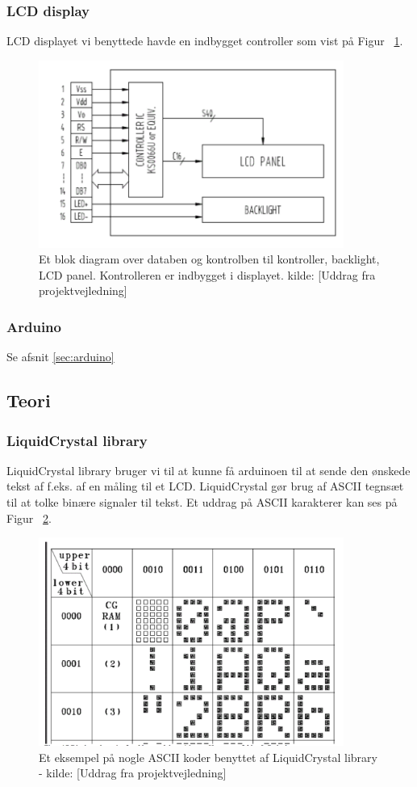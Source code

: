 \subsubsection{LCD display}
LCD displayet vi benyttede havde en indbygget controller som vist på Figur ~\ref{driver}.
\begin{figure}[H]
	\centering
    \includegraphics[width=10cm]{figures/LCDdesign/displayblokdiagram.png}
	\caption{Et blok diagram over databen og kontrolben til  kontroller, backlight, LCD panel. Kontrolleren er indbygget i displayet. kilde: [Uddrag fra projektvejledning]}
	\label{driver}
\end{figure}
\subsubsection{Arduino}
Se afsnit \ref{sec:arduino} 


\subsection{Teori}
\subsubsection{LiquidCrystal library}
LiquidCrystal library bruger vi til at kunne få arduinoen til at sende den ønskede tekst af f.eks. af en måling til et LCD. LiquidCrystal gør brug af ASCII tegnsæt til at tolke binære signaler til tekst. Et uddrag på ASCII karakterer kan ses på Figur ~\ref{ASCII}. 
\begin{figure}[H]
	\centering
    \includegraphics[width=10cm]{figures/LCDdesign/ASCII.png}
	\caption{Et eksempel på nogle ASCII koder benyttet af LiquidCrystal library - kilde: [Uddrag fra projektvejledning]}
	\label{ASCII}
\end{figure}

